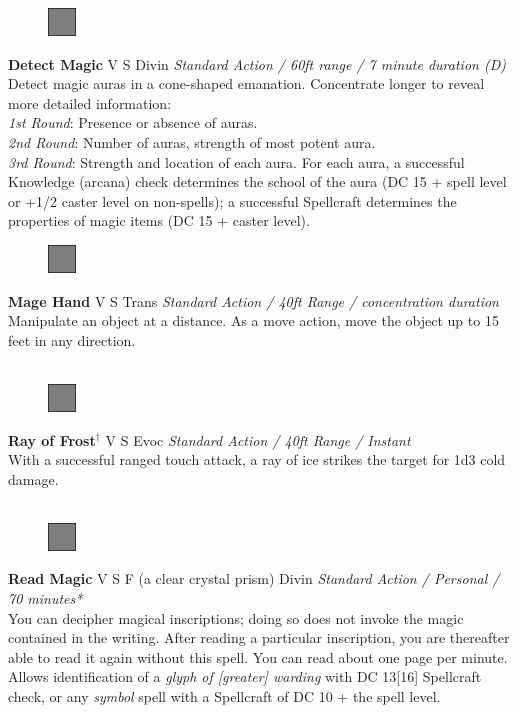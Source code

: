 \documentclass[letterpaper]{article}
\newcommand{\spell}[7]{
\begin{figure}
\vspace{-13pt}
\ifstrequal{#2}{Full}{  \includegraphics[width=2em]{Checkbox-Full}}{
\ifstrequal{#2}{Scroll}{\includegraphics[width=2em]{Checkbox-S}}{
                        \includegraphics[width=2em]{Checkbox}}}
\ifstrequal{#7}{}{\vspace{-1em}}{\vspace{#7}}
\end{figure}
\noindent \textbf{#1} #3 {
    \ifstrequal{#4}{Conj}{\color{Plum}Conj}{%
    \ifstrequal{#4}{Divin}{\color{YellowOrange}Divin}{%
    \ifstrequal{#4}{Ench}{\color{VioletRed}Ench}{%
    \ifstrequal{#4}{Trans}{\color{LimeGreen}Trans}{%
    \ifstrequal{#4}{Evoc}{\color{RedOrange}Evoc}{%
    \ifstrequal{#4}{Illu}{\color{ProcessBlue}Illu}{%
    \ifstrequal{#4}{Abjur}{\color{CadetBlue}Abjur}{%
    \ifstrequal{#4}{Necro}{\color{Red}Necro}{%
}}}}}}}}}
{\footnotesize \emph{#5}} \\
#6
}
\begin{document}


\spell{Detect Magic}{Full}{V S}{Divin}{Standard Action / 60ft range / 7 minute duration (D)}{
Detect magic auras in a cone-shaped emanation.  Concentrate longer to reveal more detailed information:\\
\emph{1st Round}: Presence or absence of auras.\\
\emph{2nd Round}: Number of auras, strength of most potent aura.\\
\emph{3rd Round}: Strength and location of each aura.  For each aura, a successful Knowledge (arcana) check determines the school of the aura (DC 15 + spell level or +1/2 caster level on non-spells); a successful Spellcraft determines the properties of magic items (DC 15 + caster level).}{3em} %



\spell{Mage Hand}{Full}{V S}{Trans}{Standard Action / 40ft Range / concentration duration}{%
Manipulate an object at a distance. As a move action, move the object up to 15 feet in any direction.\\}{}\\[-2em] %

\spell{Ray of Frost$^\dag$}{Full}{V S}{Evoc}{Standard Action / 40ft Range / Instant}{
With a successful ranged touch attack, a ray of ice strikes the target for 1d3 cold damage.\\}{}\\[-2em] %

\spell{Read Magic}{Full}{V S F (a clear crystal prism)}{Divin}{Standard Action / Personal / 70 minutes*}{
You can decipher magical inscriptions; doing so does not invoke the magic contained in the writing.  After reading a particular inscription, you are thereafter able to read it again without this spell.  You can read about one page per minute. Allows identification of a \emph{glyph of [greater] warding} with DC 13[16] Spellcraft check, or any \emph{symbol} spell with a Spellcraft of DC 10 + the spell level.}{1em}\\[-2em] %
\end{document}
